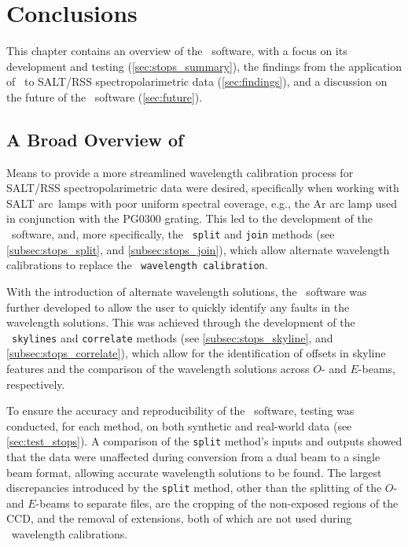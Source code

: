 \chapter{Conclusions} \label{ch:05}

This chapter contains an overview of the \stops\ software, with a focus on its development and testing (\autoref{sec:stops_summary}), the findings from the application of \stops\ to \gls{SALT}/\gls{RSS} spectro\-polarimetric data (\autoref{sec:findings}), and a discussion on the future of the \stops\ software (\autoref{sec:future}).

\section[A Broad Overview of \textsc{stops}]{A Broad Overview of \stops} \label{sec:stops_summary}

Means to provide a more streamlined wavelength calibration process for \gls{SALT}/\gls{RSS} spectropolarimetric data were desired, specifically when working with \gls{SALT} arc~lamps with poor uniform spectral coverage, e.g., the \gls{Ar} arc lamp used in conjunction with the PG$0300$ grating.
This led to the development of the \stops\ software, and, more specifically, the \stops\ \texttt{split} and \texttt{join} methods (see \autoref{subsec:stops_split}, and \ref{subsec:stops_join}), which allow alternate wavelength calibrations to replace the \polsalt\ \texttt{wavelength calibration}.

With the introduction of alternate wavelength solutions, the \stops\ software was further developed to allow the user to quickly identify any faults in the wavelength solutions.
This was achieved through the development of the \stops\ \texttt{skylines} and \texttt{correlate} methods (see \autoref{subsec:stops_skyline}, and \ref{subsec:stops_correlate}), which allow for the identification of offsets in skyline features and the comparison of the wavelength solutions across $O$- and $E$-beams, respectively.

To ensure the accuracy and reproducibility of the \stops\ software, testing was conducted, for each method, on both synthetic and real-world data (see \autoref{sec:test_stops}).
A comparison of the \texttt{split} method's inputs and outputs showed that the data were unaffected during conversion from a dual beam to a single beam format, allowing accurate wavelength solutions to be found.
The largest discrepancies introduced by the \texttt{split} method, other than the splitting of the $O$- and $E$-beams to separate files, are the cropping of the non-exposed regions of the \gls{CCD}, and the removal of extensions, both of which are not used during \iraf\ wavelength calibrations.

